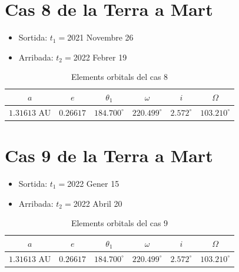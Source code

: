 \section{Cas 8 de la Terra a Mart}
\begin{itemize}
	\item Sortida: $t_{1}=$2021 Novembre 26
	\item Arribada: $t_{2}=$2022 Febrer 19
\end{itemize}
\begin{table}[h!]
	\centering
	\begin{tabular}{ |c|c|c|c|c|c|}
		\hline
		$a$ & $e$ & $\theta_{1}$ & $\omega$ & $i$ & $\Omega$ \\ \hline
		$1.31613$ AU  & $0.26617$ & $184.700^{\circ}$ & $220.499^{\circ}$ & $2.572^{\circ}$ & $103.210^{\circ}$ \\ \hline
	\end{tabular}
	\caption{Elements orbitals del cas 8}
\end{table}

\section{Cas 9 de la Terra a Mart}
\begin{itemize}
	\item Sortida: $t_{1}=$2022 Gener 15
	\item Arribada: $t_{2}=$2022 Abril 20
\end{itemize}
\begin{table}[h!]
	\centering
	\begin{tabular}{ |c|c|c|c|c|c|}
		\hline
		$a$ & $e$ & $\theta_{1}$ & $\omega$ & $i$ & $\Omega$ \\ \hline
		$1.31613$ AU  & $0.26617$ & $184.700^{\circ}$ & $220.499^{\circ}$ & $2.572^{\circ}$ & $103.210^{\circ}$ \\ \hline
	\end{tabular}
	\caption{Elements orbitals del cas 9}
\end{table}